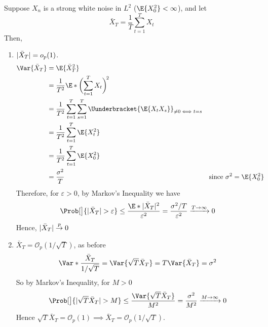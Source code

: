 \begin{Example}{}{}
    Suppose $ X_n $ is a strong white noise in $ L^2 $ ($ \E{X_0^2}<\infty $),
    and let
    \[ \bar{X}_T=\frac{1}{T} \sum_{t=1}^{T} X_t \]
    Then,
    \begin{enumerate}[(1)]
        \item $ \lvert\bar{X}_T\rvert=o_p(1) $.
              \begin{align*}
                  \Var{\bar{X}_T}
                   & =\E{\bar{X}_T^2}                                                                                                             \\
                   & =\frac{1}{T^2} \E*{\biggl(\sum_{t=1}^{T} X_t\biggr)^{\!2}}                                                                   \\
                   & =\frac{1}{T^2} \sum_{t=1}^{T} \sum_{s=1}^{T}\Uunderbracket{\E{X_t X_s}}_{\ne 0\iff t=s}                                      \\
                   & =\frac{1}{T^2} \sum_{t=1}^{T} \E{X_t^2}                                                                                      \\
                   & =\frac{1}{T^2} \sum_{t=1}^{T} \E{X_0^2}                                                                                      \\
                   & =\frac{\sigma^2}{T}                                                                     &  & \text{since }\sigma^2=\E{X_0^2}
              \end{align*}
              Therefore, for $ \varepsilon>0 $, by Markov's Inequality we have
              \[ \Prob[\big]{\abs{\bar{X}_T}>\varepsilon}\le \frac{\E*{\abs{\bar{X}_T}^2}}{\varepsilon^2}=
                  \frac{\sigma^2/T}{\varepsilon^2}\xrightarrow{T\to\infty}0  \]
              Hence, $ \lvert\bar{X}_T\rvert\stackrel{p}{\to}0 $
        \item $ \bar{X}_T=\mathcal{O}_p(1/\sqrt{T}) $, as before
              \[ \Var*{\frac{\bar{X}_T}{1/\sqrt{T}}}=\Var{\sqrt{T}\bar{X}_T}=T\Var{\bar{X}_T}=\sigma^2 \]
              So by Markov's Inequality, for $ M>0 $
              \[ \Prob[\big]{\abs{\sqrt{T}\bar{X}_T}>M}\le \frac{\Var{\sqrt{T}\bar{X}_T}}{M^2}=\frac{\sigma^2}{M^2}
                  \xrightarrow{M\to\infty}0 \]
              Hence $ \sqrt{T}\bar{X}_T=\mathcal{O}_p(1)\implies \bar{X}_T=\mathcal{O}_p(1/\sqrt{T}) $.
    \end{enumerate}
\end{Example}
